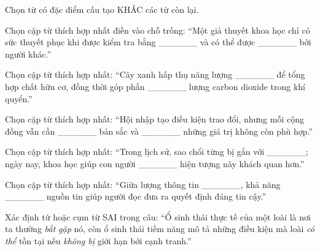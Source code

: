 \begin{ex}
Chọn từ có đặc điểm cấu tạo KHÁC các từ còn lại.
\end{ex}

\begin{ex}
Chọn cặp từ thích hợp nhất điền vào chỗ trống: “Một giả thuyết khoa học chỉ có sức thuyết phục khi được kiểm tra bằng ______ và có thể được ______ bởi người khác.”
\end{ex}

\begin{ex}
Chọn cặp từ thích hợp nhất: “Cây xanh hấp thụ năng lượng ______ để tổng hợp chất hữu cơ, đồng thời góp phần ______ lượng carbon dioxide trong khí quyển.”
\end{ex}

\begin{ex}
Chọn cặp từ thích hợp nhất: “Hội nhập tạo điều kiện trao đổi, nhưng mỗi cộng đồng vẫn cần ______ bản sắc và ______ những giá trị không còn phù hợp.”
\end{ex}

\begin{ex}
Chọn cặp từ thích hợp nhất: “Trong lịch sử, sao chổi từng bị gắn với ______; ngày nay, khoa học giúp con người ______ hiện tượng này khách quan hơn.”
\end{ex}

\begin{ex}
Chọn cặp từ thích hợp nhất: “Giữa lượng thông tin ______, khả năng ______ nguồn tin giúp người đọc đưa ra quyết định đáng tin cậy.”
\end{ex}

\begin{ex}
Xác định từ hoặc cụm từ SAI trong câu: “Ổ sinh thái thực tế của một loài là nơi ta thường \textit{bắt gặp} nó, còn ổ sinh thái tiềm năng mô tả những điều kiện mà loài \textit{có thể} tồn tại nếu \textit{không bị} giới hạn bởi cạnh tranh.”
\end{ex}

